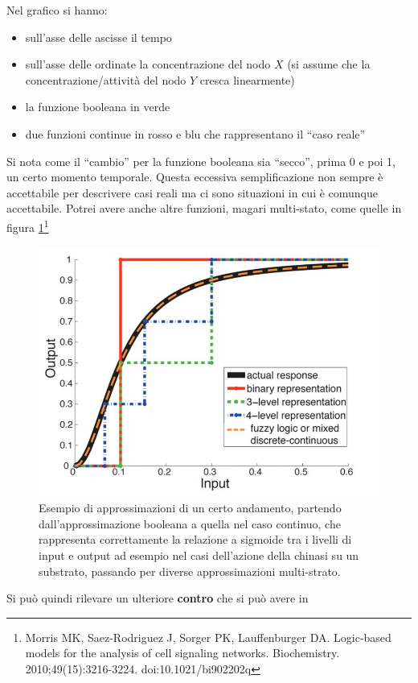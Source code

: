 \documentclass[a4paper,12pt, oneside]{book}
\begin{document}
Nel grafico si hanno:
\begin{itemize}
  \item sull'asse delle ascisse il tempo
  \item sull'asse delle ordinate la concentrazione del nodo $X$ (si assume che
  la concentrazione/attività del nodo $Y$ cresca linearmente)
  \item la funzione booleana in verde
  \item due funzioni continue in rosso e blu che rappresentano il ``caso reale''
\end{itemize}
Si nota come il ``cambio'' per la funzione booleana sia ``secco'', prima 0 e poi
1, un certo momento temporale. Questa eccessiva semplificazione non sempre è
accettabile per descrivere casi reali ma ci sono situazioni in cui è comunque
accettabile. Potrei avere anche altre funzioni, magari multi-stato, come quelle
in figura \ref{fig:funbool}\footnote{Morris MK, Saez-Rodriguez J, Sorger PK,
  Lauffenburger DA. Logic-based models for the analysis of cell signaling 
  networks. Biochemistry. 2010;49(15):3216-3224. doi:10.1021/bi902202q}
\begin{figure}
  \centering
  \includegraphics[scale = 0.35]{img/funbool.jpg}
  \caption{Esempio di approssimazioni di un certo andamento, partendo
    dall'approssimazione  booleana a
    quella nel caso continuo, che rappresenta correttamente la relazione
    a sigmoide tra i livelli di input e output ad esempio nel casi dell'azione
    della chinasi su un substrato, passando per diverse approssimazioni
    multi-strato.}  
  \label{fig:funbool}
\end{figure}
Si può quindi rilevare un ulteriore \textbf{contro} che si può avere in
\end{document}
